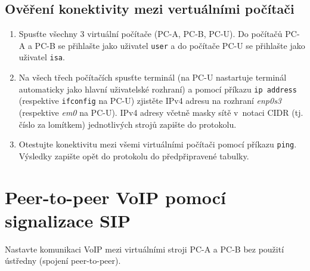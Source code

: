 \subsection{Ověření konektivity mezi vertuálními počítači}
\begin{enumerate}
	\item Spusťte všechny 3 virtuální počítače (PC-A, PC-B, PC-U). Do počítačů PC-A a PC-B se přihlašte jako uživatel \texttt{user} a do počítače PC-U se přihlašte jako uživatel \texttt{isa}.
	\item Na všech třech počítačích spusťte terminál (na PC-U nastartuje terminál automaticky jako hlavní uživatelské rozhraní) a pomocí příkazu \verb{ip address{ (respektive \verb{ifconfig{ na PC-U) zjistěte IPv4 adresu na rozhraní \emph{enp0s3} (respektive \emph{em0} na PC-U). IPv4 adresy včetně masky sítě v~notaci CIDR (tj. číslo za lomítkem) jednotlivých strojů zapište do protokolu.
	\item Otestujte konektivitu mezi všemi virtuálními počítači pomocí příkazu \verb{ping{. Výsledky zapište opět do protokolu do předpřipravené tabulky.
\end{enumerate}


\section{Peer-to-peer VoIP pomocí signalizace SIP}
Nastavte komunikaci VoIP mezi virtuálními stroji PC-A a PC-B bez použití ústředny (spojení peer-to-peer).

